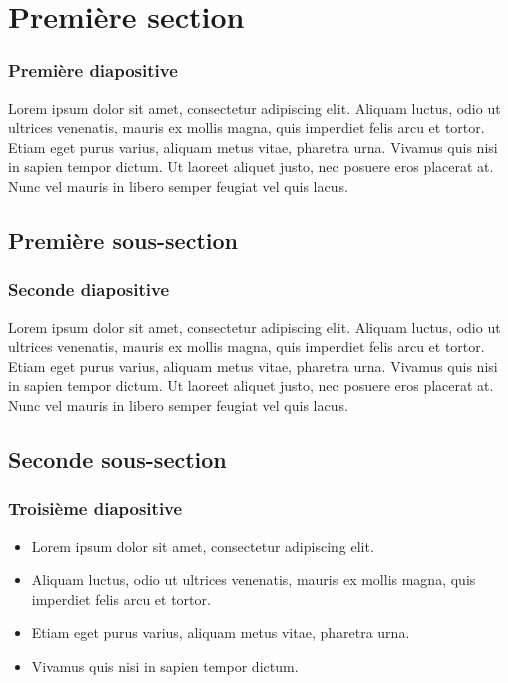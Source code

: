 \documentclass[xcolor=table]{beamer}
\begin{document}
\section{Première section}
\begin{frame}
\frametitle{Première diapositive}

Lorem ipsum dolor sit amet, consectetur adipiscing elit. Aliquam luctus, odio ut ultrices venenatis, mauris ex mollis magna, quis imperdiet felis arcu et tortor. \pause Etiam eget purus varius, aliquam metus vitae, pharetra urna. Vivamus quis nisi in sapien tempor dictum. Ut laoreet aliquet justo, nec posuere eros placerat at. Nunc vel mauris in libero semper feugiat vel quis lacus.

\end{frame}

\subsection{Première sous-section}
\begin{frame}
\frametitle{Seconde diapositive}

Lorem ipsum dolor sit amet, consectetur adipiscing elit. Aliquam luctus, odio ut ultrices venenatis, mauris ex mollis magna, quis imperdiet felis arcu et tortor. Etiam eget purus varius, aliquam metus vitae, pharetra urna. Vivamus quis nisi in sapien tempor dictum. Ut laoreet aliquet justo, nec posuere eros placerat at. Nunc vel mauris in libero semper feugiat vel quis lacus.

\end{frame}

\subsection{Seconde sous-section}
\begin{frame}
\frametitle{Troisième diapositive}

\begin{itemize}
    \item<1-3> Lorem ipsum dolor sit amet, consectetur adipiscing elit.
    \item<2> Aliquam luctus, odio ut ultrices venenatis, mauris ex mollis magna, quis imperdiet felis arcu et tortor.
    \item<1> Etiam eget purus varius, aliquam metus vitae, pharetra urna.
    \item<3> Vivamus quis nisi in sapien tempor dictum.
\end{itemize}
\end{frame}
\end{document}
